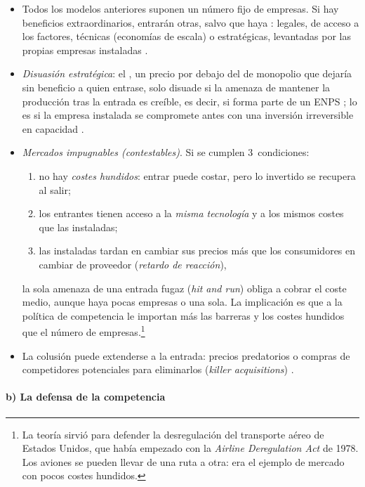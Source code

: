 \documentclass[11pt]{article}
\begin{document}
\begin{itemize}
\item Todos los modelos anteriores suponen un número fijo de empresas. Si hay beneficios extraordinarios, entrarán otras, salvo que haya : legales, de acceso a los factores, técnicas (economías de escala) o estratégicas, levantadas por las propias empresas instaladas .
\item \emph{Disuasión estratégica}: el , un precio por debajo del de monopolio que dejaría sin beneficio a quien entrase\nocite{Bain1956Barriers,Modigliani1958New}, solo disuade si la amenaza de mantener la producción tras la entrada es creíble, es decir, si forma parte de un ENPS ; lo es si la empresa instalada se compromete antes con una inversión irreversible en capacidad\nocite{Dixit1980Role} .
\item \emph{Mercados impugnables (contestables)}\nocite{Baumol1982Contestable,BaumolPanzarWillig1982Contestable}. Si se cumplen 3~condiciones:
  \begin{enumerate}
  \item no hay \emph{costes hundidos}: entrar puede costar, pero lo invertido se recupera al salir;
  \item los entrantes tienen acceso a la \emph{misma tecnología} y a los mismos costes que las instaladas;
  \item las instaladas tardan en cambiar sus precios más que los consumidores en cambiar de proveedor (\emph{retardo de reacción}),
  \end{enumerate}
  la sola amenaza de una entrada fugaz (\emph{hit and run}) obliga a cobrar el coste medio, aunque haya pocas empresas o una sola. La implicación es que a la política de competencia le importan más las barreras y los costes hundidos que el número de empresas.\footnote{La teoría sirvió para defender la desregulación del transporte aéreo de Estados Unidos, que había empezado con la \emph{Airline Deregulation Act} de 1978\nocite{EEUU1978AirlineDeregulation,BaileyBaumol1984Deregulation}. Los aviones se pueden llevar de una ruta a otra: era el ejemplo de mercado con pocos costes hundidos.}
\item La colusión puede extenderse a la entrada: precios predatorios o compras de competidores potenciales para eliminarlos (\emph{killer acquisitions})  .
\end{itemize}

\paragraph{b) La defensa de la competencia}
\end{document}
